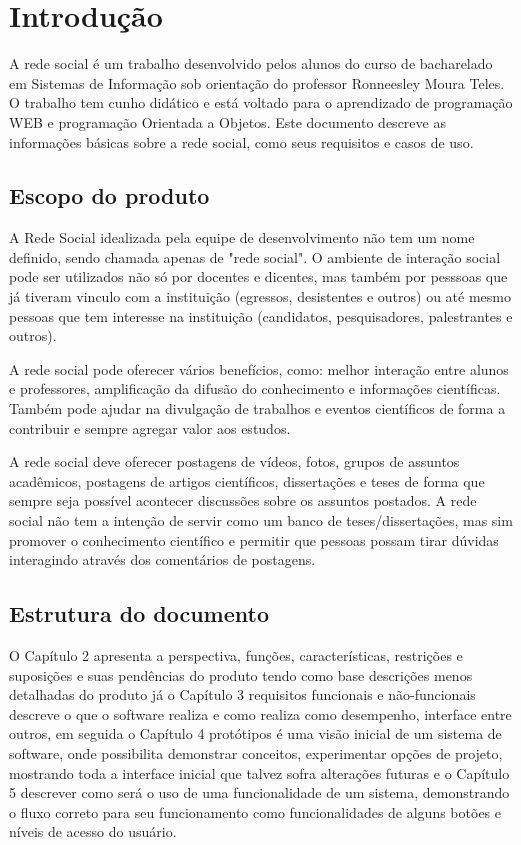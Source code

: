 \chapter{Introdução}

A rede social é um trabalho desenvolvido pelos alunos do curso de bacharelado em Sistemas de Informação sob orientação do professor Ronneesley Moura Teles.
O trabalho tem cunho didático e está voltado para o aprendizado de programação WEB e programação Orientada a Objetos.
Este documento descreve as informações básicas sobre a rede social, como seus requisitos e casos de uso.


\section{Escopo do produto}
A Rede Social idealizada pela equipe de desenvolvimento não tem um nome definido, sendo chamada apenas de "rede social".
O ambiente de interação social pode ser utilizados não só por docentes e dicentes, mas também por pesssoas que já tiveram vinculo com a instituição (egressos, desistentes e outros) ou até mesmo
pessoas que tem interesse na instituição (candidatos, pesquisadores, palestrantes e outros).

A rede social pode oferecer vários benefícios, como: melhor interação entre alunos e professores, amplificação da difusão do conhecimento e informações científicas.
Também pode ajudar na divulgação de trabalhos e eventos científicos de forma a contribuir e sempre agregar valor aos estudos.

A rede social deve oferecer postagens de vídeos, fotos, grupos de assuntos acadêmicos, postagens de artigos científicos, dissertações e teses de forma que sempre seja possível 
acontecer discussões sobre os assuntos postados. A rede social não tem a intenção de servir como um banco de teses/dissertações, mas sim promover o conhecimento científico e permitir
que pessoas possam tirar dúvidas interagindo através dos comentários de postagens. 
  

\section{Estrutura do documento}

O Capítulo 2 apresenta a perspectiva, funções, características, restrições e suposições e suas pendências do produto tendo como base descrições menos detalhadas do produto já o Capítulo 3 requisitos funcionais e não-funcionais descreve o que o software realiza e como realiza como desempenho, interface entre outros, em seguida o Capítulo 4 protótipos é uma visão inicial de um sistema de software, onde possibilita demonstrar conceitos, experimentar opções de projeto, mostrando toda a interface inicial que talvez sofra alterações futuras e o Capítulo 5 descrever como será o uso de uma funcionalidade de um sistema, demonstrando o fluxo correto para seu funcionamento como funcionalidades de alguns botões e níveis de acesso do usuário.